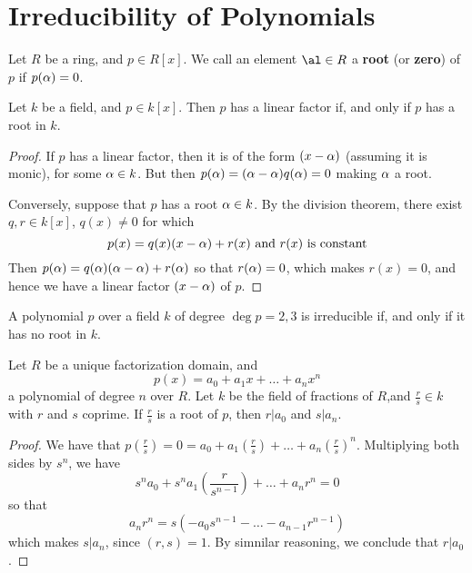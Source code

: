 \section{Irreducibility of Polynomials}
\label{section_7.3}

\begin{definition}
    Let $R$ be a ring, and  $p \in R[x]$. We call an element $\al \in R$ a
    \textbf{root} (or \textbf{zero}) of $p$ if  $p(\alpha)=0$.
\end{definition}

\begin{lemma}\label{lemma_7.3.1}
    Let $k$ be a field, and  $p \in k[x]$. Then $p$ has a linear factor if, and
    only if  $p$ has a root in  $k$.
\end{lemma}
\begin{proof}
    If $p$ has a linear factor, then it is of the form  $(x-\alpha)$ (assuming it is
    monic), for some $\alpha \in k$. But then  $p(\alpha)=(\alpha-\alpha)q(\alpha)=0$ making $\alpha$ a
    root.

    Conversely, suppose that $p$ has a root  $\alpha \in k$. By the division
    theorem, there exist $q, r \in k[x]$, $q(x) \neq 0$ for which
    \begin{equation*}
        p(x)=q(x)(x-\alpha)+r(x) \text{ and } r(x) \text{ is constant}
    \end{equation*}
    Then $p(\alpha)=q(\alpha)(\alpha-\alpha)+r(\alpha)$ so that $r(\alpha)=0$, which makes $r(x)=0$, and
    hence we have a linear factor $(x-\alpha)$ of $p$.
\end{proof}
\begin{corollary}
    A polynomial $p$ over a field $k$ of degree $\deg{p}=2,3$ is irreducible if,
    and only if it has no root in $k$.
\end{corollary}

\begin{lemma}\label{lemma_7.3.2}
    Let $R$ be a unique factorization domain, and
    \begin{equation*}
        p(x)=a_0+a_1x+\dots+a_nx^n
    \end{equation*}
    a polynomial of degree $n$ over $R$. Let $k$ be the field of fractions of
    $R$,and $\frac{r}{s} \in k$ with $r$ and $s$ coprime. If $\frac{r}{s}$ is a
    root of $p$, then  $r|a_0$ and $s|a_n$.
\end{lemma}
\begin{proof}
    We have that
    $p(\frac{r}{s})=0=a_0+a_1(\frac{r}{s})+\dots+a_n(\frac{r}{s})^n$.
    Multiplying both sides by $s^n$, we have
    \begin{equation*}
        s^na_0+s^na_1(\frac{r}{s^{n-1}})+\dots+a_nr^n=0
    \end{equation*}
    so that
    \begin{equation*}
        a_nr^n=s(-a_0s^{n-1}- \dots -a_{n-1}r^{n-1})
    \end{equation*}
    which makes $s|a_n$, since $(r,s)=1$. By simnilar reasoning, we conclude that
    $r|a_0$.
\end{proof}

